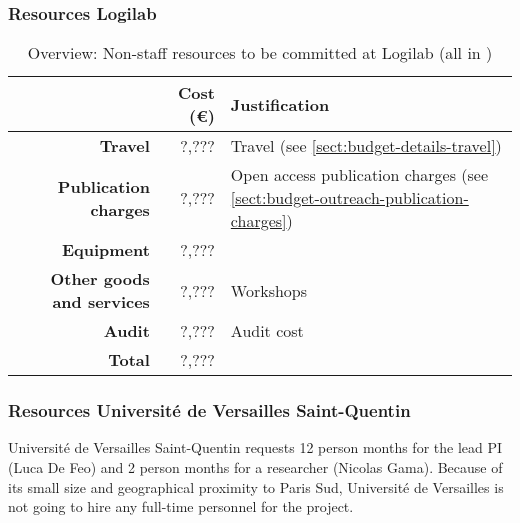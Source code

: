 \subsubsection{Resources Logilab}


\bigskip
\begin{table}[H]
\begin{tabular}{|r|r|p{9cm}|}
\hline
\textbf{} & \textbf{Cost (\euro)} & \textbf{Justification} \\\hline
\textbf{Travel} & ?,??? & Travel (see \ref{sect:budget-details-travel})\\\hline
\textbf{Publication charges} & ?,??? & Open access publication charges (see \ref{sect:budget-outreach-publication-charges})\\\hline
\textbf{Equipment} & ?,??? &  \\\hline    %

\textbf{Other goods and services} & ?,??? & Workshops \\\hline   %
\textbf{Audit} & ?,??? & Audit cost \\\hline
\textbf{Total} & ?,???\\\cline{1-2}
\end{tabular}
\caption{Overview: Non-staff resources to be committed at Logilab (all in \texteuro)}\vspace*{-1em}
\end{table}




\subsubsection{Resources Universit\'{e} de Versailles Saint-Quentin}

Universit\'{e} de Versailles Saint-Quentin requests 12 person months
for the lead PI (Luca De Feo) and 2 person months for a researcher
(Nicolas Gama). Because of its small size and geographical proximity
to Paris Sud, Universit\'{e} de Versailles is not going to hire any
full-time personnel for the project.

